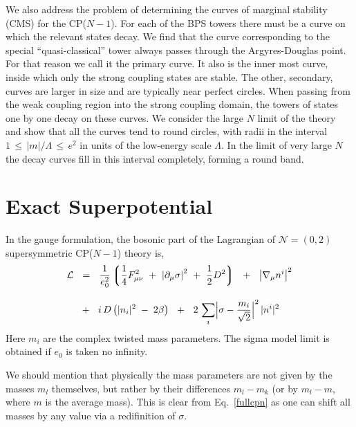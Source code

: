 \documentclass[epsfig,12pt]{article}
\newcommand{\cell}{{\mathcal L}}
\newcommand{\pt}{\partial}
\newcommand{\ntwoo}{${\mathcal N}= \left(0,2\right) $ }
\newcommand{\lgr}{\left\lgroup}
\newcommand{\rgr}{\right\rgroup}
\begin{document}
	We also address the problem of determining the curves of marginal stability (CMS) for the CP($N-1$).
	For each of the BPS towers there must be a curve on which the relevant states decay.
	We find that the curve corresponding to the special ``quasi-classical'' tower 
	always passes through the Argyres-Douglas point. 
	For that reason we call it the primary curve.
	It also is the inner most curve, inside which only the strong coupling states are stable.
	The other, secondary, curves are larger in size and are typically near perfect circles. 	
	When passing from the weak coupling region into the strong coupling domain, the 
	towers of states one by one decay on these curves.
	We consider the large $ N $ limit of the theory and show that all the curves tend to round circles,
	with radii in the interval $ 1 \,\leq\, |m|/\Lambda \,\leq\, e^2 $ in units of the 
	low-energy scale $ \Lambda $.
	In the limit of very large $ N $ the decay curves fill in this interval completely, forming
	a round band.

\section{Exact Superpotential}
\label{super}

In the gauge formulation, the bosonic part of the Lagrangian of \ntwoo supersymmetric CP($N-1$) theory is,
\begin{align}
%
\cell & ~~=~~ 
	\frac{1}{e_0^2} \lgr \frac{1}{4} F_{\mu\nu}^2 ~+~ \left|\pt_\mu\sigma\right|^2 ~+~ \frac{1}{2}D^2 \rgr
 	~~+~~ \left|\nabla_\mu n^i\right|^2 
	\nonumber
	\\[3mm]
%
&
	~~+~~ i\,D\left( |n_i|^2 \;-\; 2\beta \right)
	~~+~~ 2\,\sum_i \Bigl| \sigma-\frac{m_i}{\sqrt 2} \Bigr|^2\, |n^i|^2
\label{fullcpn}
\end{align}
	Here $ m_i $ are the complex twisted mass parameters. 
	The sigma model limit is obtained if $ e_0 $ is taken no infinity.

	We should mention that physically the mass parameters are not given by the masses $ m_l $ themselves,
	but rather by their differences $ m_l - m_k $ (or by $ m_l - m $, where $ m $ is the average mass).
	This is clear from Eq.~\eqref{fullcpn} as one can shift all masses by any value via a redifinition of
	$ \sigma $.
\end{document}
